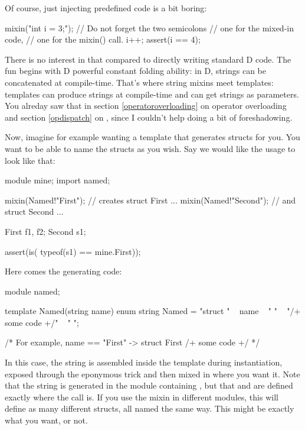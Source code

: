 Of course, just injecting predefined code is a bit boring:

\begin{dcode}
mixin("int i = 3;"); // Do not forget the two semicolons
                     // one for the mixed-in code,
                     // one for the mixin() call.
i++;
assert(i == 4);
\end{dcode}

There is no interest in that compared to directly writing standard D code. The fun begins with D powerful constant folding ability: in D, strings can be concatenated at compile-time. That's where string mixins meet templates: templates can produce strings at compile-time and can get strings as parameters. You alreday saw that in section \ref{operatoroverloading} on operator overloading and section \ref{opdispatch} on , since I couldn't help doing a bit of foreshadowing.

Now, imagine for example wanting a template that generates structs for you. You want to be able to name the structs as you wish. Say we would like the usage to look like that:

\begin{dcode}
module mine;
import named;

mixin(Named!"First");  // creates struct First { ... }
mixin(Named!"Second"); // and struct Second { ... }

First f1, f2;
Second s1;

assert(is( typeof(s1) == mine.First));
\end{dcode}

Here comes the generating code:

\begin{dcode}
module named;

template Named(string name)
{
    enum string Named = "struct " ~ name ~ " { "
                      ~ "/+ some code +/"
                      ~ " }";
}

/* For example, name == "First" ->
   struct First { /+ some code +/ }
*/
\end{dcode}

In this case, the string is assembled inside the template during instantiation,  exposed through the eponymous trick and then mixed in where you want it. Note that the string is generated in the module containing , but that  and  are defined exactly where the \DD{()} call is. If you use the mixin in different modules, this will define as many different structs, all named the same way. This might be exactly what you want, or not.

